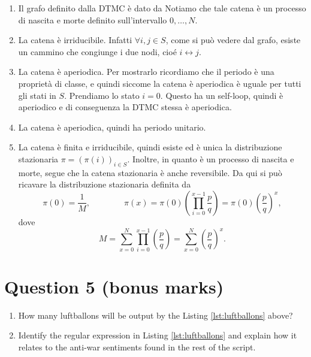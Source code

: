 \documentclass[
	12pt, %
]{fphw}
\begin{document}
\begin{enumerate}
	\item Il grafo definito dalla DTMC è dato da
		Notiamo che tale catena è un processo di nascita e morte definito sull'intervallo $0, \dots, N$.
	\item La catena è irriducibile. Infatti $\forall i,j \in S$, come si può vedere dal grafo, esiste un cammino che congiunge i due nodi, cioé $i \leftrightarrow j$.
	\item La catena è aperiodica. Per mostrarlo ricordiamo che il periodo è una proprietà di classe, e quindi siccome la catena è aperiodica è uguale per tutti gli stati in $S$.
		Prendiamo lo stato $i = 0$. Questo ha un self-loop, quindi è aperiodico e di conseguenza la DTMC stessa è aperiodica.
	\item La catena è aperiodica, quindi ha periodo unitario.
	\item La catena è finita e irriducibile, quindi esiste ed è unica la distribuzione stazionaria $\pi = (\pi(i))_{i \in S}$.
		Inoltre, in quanto è un processo di nascita e morte, segue che la catena stazionaria è anche reversibile.
		Da qui si può ricavare la distribuzione stazionaria definita da
		\begin{equation*}
			\pi(0) = \frac{1}{M},	\qquad\qquad	\pi(x) = \pi(0) \left( \prod_{i=0}^{x-1} \frac{p}{q} \right) = \pi(0) \left(\frac{p}{q}\right)^x,
		\end{equation*}
		dove
		\begin{equation*}
			M = \sum_{x=0}^N \prod_{i=0}^{x-1} \left( \frac{p}{q} \right) = \sum_{x=0}^N \left(\frac{p}{q}\right)^x.
		\end{equation*}
		
	
\end{enumerate}

\section*{Question 5 (bonus marks)}

\begin{problem}
	
	
	\begin{enumerate}
		\item How many luftballons will be output by the Listing \ref{lst:luftballons} above?
		\item Identify the regular expression in Listing \ref{lst:luftballons} and explain how it relates to the anti-war sentiments found in the rest of the script.
	\end{enumerate}

\end{problem}
\end{document}
